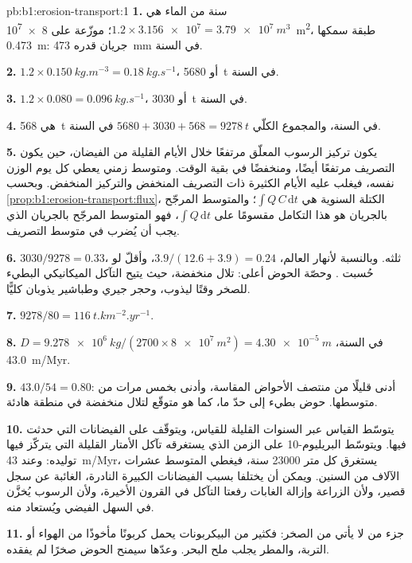 \begin{solution}{pb:b1:erosion-transport:1}
\textbf{1.} سنة من الماء هي $1.2 \times \num{3.156e7} = \qty{3.79e7}{m^3}$؛ موزّعة على \qty{8e7}{m^2}، طبقة سمكها \qty{0.473}{m}: جريان قدره \qty{473}{mm} في السنة.

\textbf{2.} $1.2 \times \qty{0.150}{kg.m^{-3}} = \qty{0.18}{kg.s^{-1}}$، أو
\qty{5680}{t} في السنة.

\textbf{3.} $1.2 \times 0.080 = \qty{0.096}{kg.s^{-1}}$، أو \qty{3030}{t} في
السنة.

\textbf{4.}  هي \qty{568}{t} في السنة، والمجموع الكلّي $5680 + 3030 +
568 = \qty{9278}{t}$ في السنة.

\textbf{5.} يكون تركيز الرسوب المعلّق مرتفعًا خلال الأيام القليلة من الفيضان، حين يكون التصريف مرتفعًا أيضًا، ومنخفضًا في بقية الوقت. ومتوسط زمني يعطي كل يوم الوزن نفسه، فيغلب عليه الأيام الكثيرة ذات التصريف المنخفض والتركيز المنخفض. وبحسب \cref{prop:b1:erosion-transport:flux}، الكتلة السنوية هي $\int Q\,C\,\mathrm dt$؛ والمتوسط المرجّح بالجريان هو هذا التكامل مقسومًا على $\int Q\,\mathrm dt$، فهو المتوسط المرجّح بالجريان الذي يجب أن يُضرب في متوسط التصريف.

\textbf{6.} $3030/9278 = \num{0.33}$، ثلثه. وبالنسبة لأنهار العالم، $3.9/(12.6 + 3.9) = \num{0.24}$، وأقلّ لو حُسبت . وحصّة الحوض أعلى: تلال منخفضة، حيث يتيح التآكل الميكانيكي البطيء للصخر وقتًا ليذوب، وحجر جيري وطباشير يذوبان كليًّا.

\textbf{7.} $9278/80 = \qty{116}{t.km^{-2}.yr^{-1}}$.

\textbf{8.} $D = \qty{9.278e6}{kg}/(2700 \times \qty{8e7}{m^2}) =
\qty{4.30e-5}{m}$ في السنة، \qty{43.0}{m/Myr}.

\textbf{9.} $43.0/54 = 0.80$: أدنى قليلًا من منتصف الأحواض المقاسة، وأدنى بخمس مرات من متوسطها. حوض بطيء إلى حدّ ما، كما هو متوقّع لتلال منخفضة في منطقة هادئة.

\textbf{10.} يتوسّط القياس عبر السنوات القليلة للقياس، ويتوقّف على الفيضانات التي حدثت فيها. ويتوسّط البريليوم-10 على الزمن الذي يستغرقه تآكل الأمتار القليلة التي يتركّز فيها توليده: وعند \qty{43}{m/Myr}، يستغرق كل متر \num{23000} سنة، فيغطي المتوسط عشرات الآلاف من السنين. ويمكن أن يختلفا بسبب الفيضانات الكبيرة النادرة، الغائبة عن سجل قصير، ولأن الزراعة وإزالة الغابات رفعتا التآكل في القرون الأخيرة، ولأن الرسوب يُخزَّن في السهل الفيضي ويُستعاد منه.

\textbf{11.} جزء من  لا يأتي من الصخر: فكثير من البيكربونات يحمل كربونًا مأخوذًا من الهواء أو التربة، والمطر يجلب ملح البحر. وعدّها سيمنح الحوض صخرًا لم يفقده.


\end{solution}
